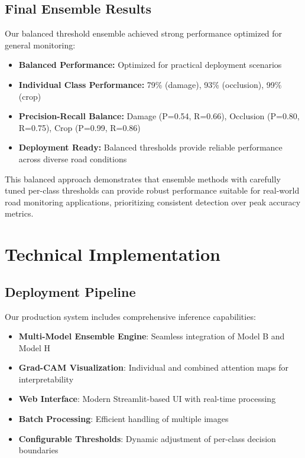 \documentclass[12pt]{article}
\begin{document}
\subsection{Final Ensemble Results}

Our balanced threshold ensemble achieved strong performance optimized for general monitoring:

\begin{itemize}[itemsep=1pt,parsep=0pt,topsep=3pt]
\item \textbf{Balanced Performance:} Optimized for practical deployment scenarios
\item \textbf{Individual Class Performance:} 79\% (damage), 93\% (occlusion), 99\% (crop)
\item \textbf{Precision-Recall Balance:} Damage (P=0.54, R=0.66), Occlusion (P=0.80, R=0.75), Crop (P=0.99, R=0.86)
\item \textbf{Deployment Ready:} Balanced thresholds provide reliable performance across diverse road conditions
\end{itemize}

This balanced approach demonstrates that ensemble methods with carefully tuned per-class thresholds can provide robust performance suitable for real-world road monitoring applications, prioritizing consistent detection over peak accuracy metrics.

\section{Technical Implementation}

\subsection{Deployment Pipeline}

Our production system includes comprehensive inference capabilities:

\begin{itemize}[itemsep=1pt,parsep=0pt,topsep=3pt]
\item \textbf{Multi-Model Ensemble Engine}: Seamless integration of Model B and Model H
\item \textbf{Grad-CAM Visualization}: Individual and combined attention maps for interpretability
\item \textbf{Web Interface}: Modern Streamlit-based UI with real-time processing
\item \textbf{Batch Processing}: Efficient handling of multiple images
\item \textbf{Configurable Thresholds}: Dynamic adjustment of per-class decision boundaries
\end{itemize}
\end{document}
